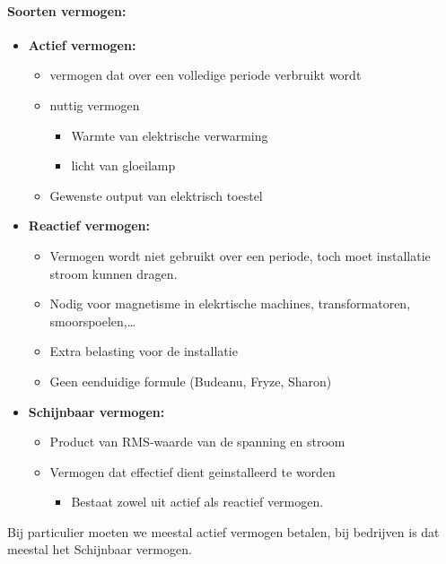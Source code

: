 \documentclass[12pt]{article}
\begin{document}
\paragraph{Soorten vermogen:}
\begin{itemize}
    \item \textbf{Actief vermogen:}\begin{itemize}
        \item vermogen dat over een volledige periode verbruikt wordt
        \item nuttig vermogen\begin{itemize}
            \item Warmte van elektrische verwarming
            \item licht van gloeilamp
        \end{itemize}
        \item  Gewenste output van elektrisch toestel
    \end{itemize}
\end{itemize}
\begin{itemize}
    \item \textbf{Reactief vermogen:}\begin{itemize}
        \item Vermogen wordt niet gebruikt over een periode, toch moet installatie stroom kunnen dragen.
        \item Nodig voor magnetisme in elekrtische machines, transformatoren, smoorspoelen,\dots
        \item  Extra belasting voor de installatie 
        \item Geen eenduidige formule (Budeanu, Fryze, Sharon)
    \end{itemize}
\end{itemize}
\begin{itemize}
    \item \textbf{Schijnbaar vermogen:}\begin{itemize}
        \item Product van RMS-waarde van de spanning en stroom
        \item Vermogen dat effectief dient geinstalleerd te worden\begin{itemize}
            \item Bestaat zowel uit actief als reactief vermogen.
        \end{itemize}
    \end{itemize}
\end{itemize}
Bij particulier moeten we meestal actief vermogen betalen, bij bedrijven is dat meestal het Schijnbaar vermogen.
\end{document}
